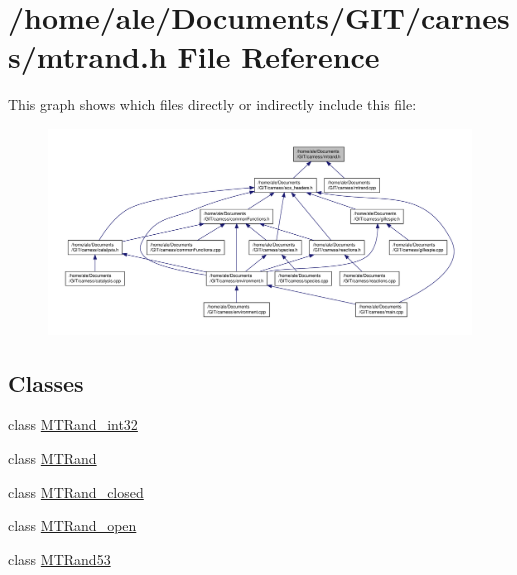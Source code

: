 \hypertarget{a00085}{\section{/home/ale/\-Documents/\-G\-I\-T/carness/mtrand.h File Reference}
\label{a00085}
}
This graph shows which files directly or indirectly include this file\-:\nopagebreak
\begin{figure}[H]
\begin{center}
\leavevmode
\includegraphics[width=350pt]{a00134}
\end{center}
\end{figure}
\subsection*{Classes}
\begin{DoxyCompactItemize}
\item 
class \hyperlink{a00013}{M\-T\-Rand\-\_\-int32}
\item 
class \hyperlink{a00010}{M\-T\-Rand}
\item 
class \hyperlink{a00012}{M\-T\-Rand\-\_\-closed}
\item 
class \hyperlink{a00014}{M\-T\-Rand\-\_\-open}
\item 
class \hyperlink{a00011}{M\-T\-Rand53}
\end{DoxyCompactItemize}
